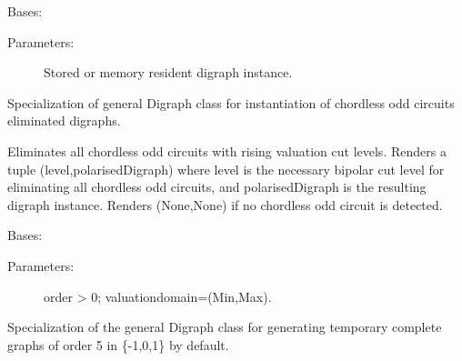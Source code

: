 \documentclass[letterpaper,10pt,english]{sphinxmanual}
\begin{document}

\begin{fulllineitems}
\label{techDoc:digraphs.CoceDigraph}
Bases: {\hyperref[techDoc:digraphs.Digraph]{}}
\begin{description}
\item[{Parameters:}] \leavevmode
Stored or memory resident digraph instance.

\end{description}

Specialization of general Digraph class for instantiation
of chordless odd circuits eliminated digraphs.

\begin{fulllineitems}
\label{techDoc:digraphs.CoceDigraph.iterateCocElimination}
Eliminates all chordless odd circuits with rising valuation cut levels.
Renders a tuple (level,polarisedDigraph) where level is the
necessary bipolar cut level for eliminating all chordless odd circuits,
and polarisedDigraph is the resulting digraph instance.
Renders (None,None) if no chordless odd circuit is detected.

\end{fulllineitems}


\end{fulllineitems}


\begin{fulllineitems}
\label{techDoc:digraphs.CompleteDigraph}
Bases: {\hyperref[techDoc:digraphs.Digraph]{}}
\begin{description}
\item[{Parameters:}] \leavevmode
order \textgreater{} 0; valuationdomain=(Min,Max).

\end{description}

Specialization of the general Digraph class for generating
temporary complete graphs of order 5 in \{-1,0,1\} by default.

\end{fulllineitems}
\end{document}
